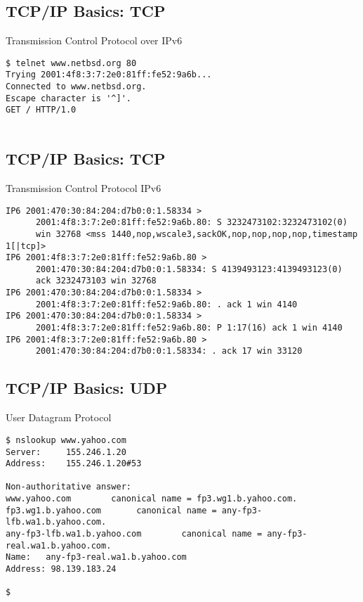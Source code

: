 \documentclass[xga]{xdvislides}
\begin{document}
\subsection{TCP/IP Basics: TCP}
\begin{center}
Transmission Control Protocol over IPv6
\end{center}
\vspace{.2in}
\begin{verbatim}
$ telnet www.netbsd.org 80
Trying 2001:4f8:3:7:2e0:81ff:fe52:9a6b...
Connected to www.netbsd.org.
Escape character is '^]'.
GET / HTTP/1.0


\end{verbatim}

\subsection{TCP/IP Basics: TCP}
\begin{center}
Transmission Control Protocol IPv6
\end{center}
\vspace{.2in}
\begin{verbatim}
IP6 2001:470:30:84:204:d7b0:0:1.58334 >
      2001:4f8:3:7:2e0:81ff:fe52:9a6b.80: S 3232473102:3232473102(0)
      win 32768 <mss 1440,nop,wscale3,sackOK,nop,nop,nop,nop,timestamp 1[|tcp]>
IP6 2001:4f8:3:7:2e0:81ff:fe52:9a6b.80 >
      2001:470:30:84:204:d7b0:0:1.58334: S 4139493123:4139493123(0)
      ack 3232473103 win 32768
IP6 2001:470:30:84:204:d7b0:0:1.58334 >
      2001:4f8:3:7:2e0:81ff:fe52:9a6b.80: . ack 1 win 4140
IP6 2001:470:30:84:204:d7b0:0:1.58334 >
      2001:4f8:3:7:2e0:81ff:fe52:9a6b.80: P 1:17(16) ack 1 win 4140
IP6 2001:4f8:3:7:2e0:81ff:fe52:9a6b.80 >
      2001:470:30:84:204:d7b0:0:1.58334: . ack 17 win 33120
\end{verbatim}


\subsection{TCP/IP Basics: UDP}
\begin{center}
User Datagram Protocol
\end{center}
\vspace{.2in}
\begin{verbatim}
$ nslookup www.yahoo.com
Server:		155.246.1.20
Address:	155.246.1.20#53

Non-authoritative answer:
www.yahoo.com        canonical name = fp3.wg1.b.yahoo.com.
fp3.wg1.b.yahoo.com       canonical name = any-fp3-lfb.wa1.b.yahoo.com.
any-fp3-lfb.wa1.b.yahoo.com        canonical name = any-fp3-real.wa1.b.yahoo.com.
Name:	any-fp3-real.wa1.b.yahoo.com
Address: 98.139.183.24

$
\end{verbatim}
\end{document}
